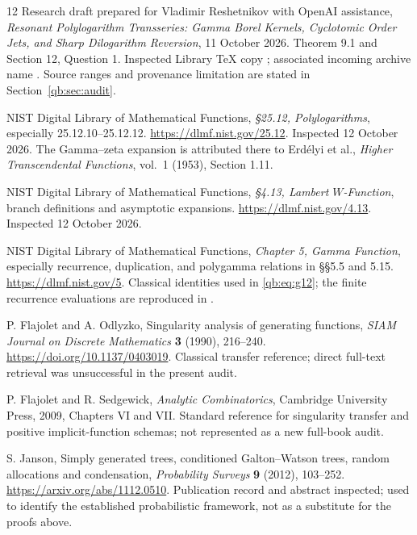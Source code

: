 \documentclass[11pt,a4paper]{article}
\theoremstyle{definition}\newtheorem{definition}[theorem]{Definition}
\theoremstyle{remark}\newtheorem{remark}[theorem]{Remark}
\numberwithin{equation}{section}
\begin{document}
\clearpage
{}
{}
\begingroup\small
\begin{thebibliography}{12}
\setlength{\itemsep}{3pt}
Research draft prepared for Vladimir Reshetnikov with OpenAI assistance,
\emph{Resonant Polylogarithm Transseries: Gamma Borel Kernels, Cyclotomic
Order Jets, and Sharp Dilogarithm Reversion}, 11 October 2026.
Theorem 9.1 and Section 12, Question 1. Inspected Library TeX copy
; associated incoming archive name
.
Source ranges and provenance limitation are stated in Section~\ref{qb:sec:audit}.

NIST Digital Library of Mathematical Functions,
\emph{\S25.12, Polylogarithms}, especially 25.12.10--25.12.12.
\url{https://dlmf.nist.gov/25.12}. Inspected 12 October 2026.
The Gamma--zeta expansion is attributed there to Erd\'elyi et al.,
\emph{Higher Transcendental Functions}, vol.~1 (1953), Section 1.11.

NIST Digital Library of Mathematical Functions,
\emph{\S4.13, Lambert $W$-Function}, branch definitions and asymptotic
expansions. \url{https://dlmf.nist.gov/4.13}. Inspected 12 October 2026.

NIST Digital Library of Mathematical Functions,
\emph{Chapter 5, Gamma Function}, especially recurrence, duplication,
and polygamma relations in \S\S5.5 and 5.15.
\url{https://dlmf.nist.gov/5}. Classical identities used in
\eqref{qb:eq:g12}; the finite recurrence evaluations are reproduced in
.

P. Flajolet and A. Odlyzko,
Singularity analysis of generating functions,
\emph{SIAM Journal on Discrete Mathematics} \textbf{3} (1990), 216--240.
\url{https://doi.org/10.1137/0403019}.
Classical transfer reference; direct full-text retrieval was unsuccessful
in the present audit.

P. Flajolet and R. Sedgewick,
\emph{Analytic Combinatorics}, Cambridge University Press, 2009,
Chapters VI and VII. Standard reference for singularity transfer and
positive implicit-function schemas; not represented as a new full-book
audit.

S. Janson,
Simply generated trees, conditioned Galton--Watson trees, random allocations
and condensation, \emph{Probability Surveys} \textbf{9} (2012), 103--252.
\url{https://arxiv.org/abs/1112.0510}.
Publication record and abstract inspected; used to identify the established
probabilistic framework, not as a substitute for the proofs above.


\end{thebibliography}
\end{document}
